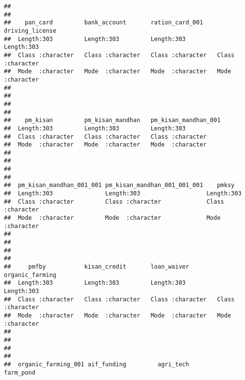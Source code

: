 \documentclass[
]{article}
\begin{document}
\begin{verbatim}
##                                                                       
##                                                                       
##    pan_card         bank_account       ration_card_001    driving_license   
##  Length:303         Length:303         Length:303         Length:303        
##  Class :character   Class :character   Class :character   Class :character  
##  Mode  :character   Mode  :character   Mode  :character   Mode  :character  
##                                                                             
##                                                                             
##                                                                             
##                                                                             
##    pm_kisan         pm_kisan_mandhan   pm_kisan_mandhan_001
##  Length:303         Length:303         Length:303          
##  Class :character   Class :character   Class :character    
##  Mode  :character   Mode  :character   Mode  :character    
##                                                            
##                                                            
##                                                            
##                                                            
##  pm_kisan_mandhan_001_001 pm_kisan_mandhan_001_001_001    pmksy          
##  Length:303               Length:303                   Length:303        
##  Class :character         Class :character             Class :character  
##  Mode  :character         Mode  :character             Mode  :character  
##                                                                          
##                                                                          
##                                                                          
##                                                                          
##     pmfby           kisan_credit       loan_waiver        organic_farming   
##  Length:303         Length:303         Length:303         Length:303        
##  Class :character   Class :character   Class :character   Class :character  
##  Mode  :character   Mode  :character   Mode  :character   Mode  :character  
##                                                                             
##                                                                             
##                                                                             
##                                                                             
##  organic_farming_001 aif_funding         agri_tech          farm_pond        

\end{verbatim}
\end{document}
